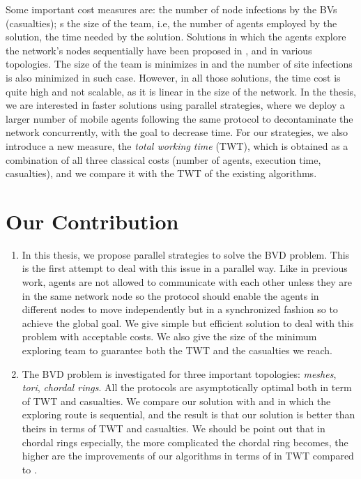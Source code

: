 Some important cost measures are: 
 the number of node infections by the BVs (casualties); s
the size of the team, i.e, the number of agents employed by the solution, 
the time needed by the solution. 
Solutions in which the agents explore the network's nodes sequentially have been proposed in \cite{Cai}, \cite{Alotaibi} and \cite{Cai1} in various topologies. The size of the team is minimizes in \cite{Cai,Cai1} and the number of site infections is also minimized in such case. However, in all those solutions, the time cost is quite high and not scalable, as it is linear in the size of the network.  In the thesis, we are interested in faster solutions using parallel strategies, where we deploy a larger number of mobile agents following the same protocol to decontaminate the network concurrently,  with the goal to  decrease time. For our strategies, we also introduce a new measure,   the {\em total working time} (TWT),  which is obtained as a combination of all three classical costs (number of agents,    execution time, casualties), and we compare it with the TWT of the existing algorithms.


\section{Our Contribution} 


\begin{enumerate}
\item In this thesis, we propose parallel strategies to solve the BVD problem. This is the first attempt to deal with this issue in a parallel way. Like in previous work, agents are not allowed to communicate with each other unless they are in the same network node so the protocol should enable the agents in different nodes to move independently but in  a synchronized fashion so to achieve the global goal.
We give simple but efficient solution to deal with this problem with acceptable costs. We also give the size of the minimum exploring team  to guarantee both the TWT and the  casualties we reach.  
\item The BVD problem is investigated for three important topologies: {\em meshes}, {\em tori}, {\em chordal rings}. All the protocols are asymptotically optimal both in term of TWT and casualties. We compare our solution with \cite{Cai} and \cite{Alotaibi} in which the exploring route is  sequential, and the result is that our solution is better than theirs in terms of TWT and casualties. We  should be point out that in chordal rings especially, the more complicated the chordal ring becomes, the higher are the improvements of our algorithms in terms of in TWT  compared to \cite{Alotaibi}.
\end{enumerate}

